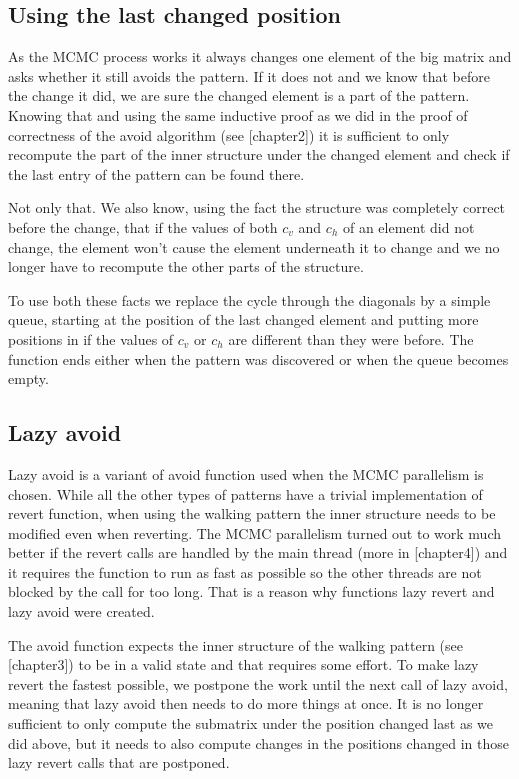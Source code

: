 \subsection{Using the last changed position}
As the MCMC process works it always changes one element of the big matrix and asks whether it still avoids the pattern. If it does not and we know that before the change it did, we are sure the changed element is a part of the pattern. Knowing that and using the same inductive proof as we did in the proof of correctness of the avoid algorithm (see [chapter2]) it is sufficient to only recompute the part of the inner structure under the changed element and check if the last entry of the pattern can be found there.

Not only that. We also know, using the fact the structure was completely correct before the change, that if the values of both $c_v$ and $c_h$ of an element did not change, the element won't cause the element underneath it to change and we no longer have to recompute the other parts of the structure.

To use both these facts we replace the cycle through the diagonals by a simple queue, starting at the position of the last changed element and putting more positions in if the values of $c_v$ or $c_h$ are different than they were before. The function ends either when the pattern was discovered or when the queue becomes empty.

\subsection{Lazy avoid}
Lazy avoid is a variant of avoid function used when the MCMC parallelism is chosen. While all the other types of patterns have a trivial implementation of revert function, when using the walking pattern the inner structure needs to be modified even when reverting. The MCMC parallelism turned out to work much better if the revert calls are handled by the main thread (more in [chapter4]) and it requires the function to run as fast as possible so the other threads are not blocked by the call for too long. That is a reason why functions lazy revert and lazy avoid were created.

The avoid function expects the inner structure of the walking pattern (see [chapter3]) to be in a valid state and that requires some effort. To make lazy revert the fastest possible, we postpone the work until the next call of lazy avoid, meaning that lazy avoid then needs to do more things at once. It is no longer sufficient to only compute the submatrix under the position changed last as we did above, but it needs to also compute changes in the positions changed in those lazy revert calls that are postponed.


